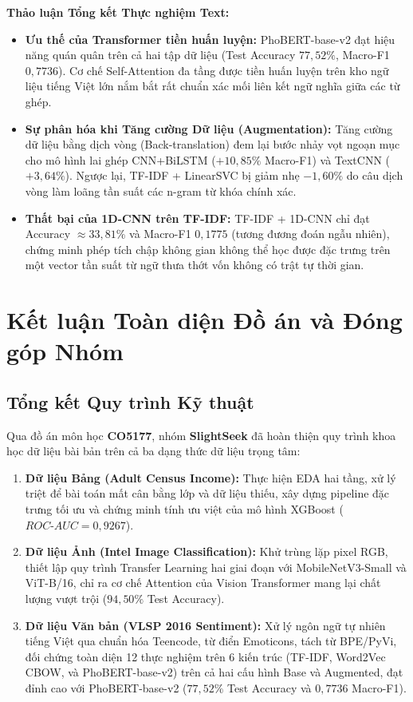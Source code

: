 \documentclass[a4paper,11pt]{article}
\begin{document}
\noindent \textbf{Thảo luận Tổng kết Thực nghiệm Text:}
\begin{itemize}
    \item \textbf{Ưu thế của Transformer tiền huấn luyện:} PhoBERT-base-v2 đạt hiệu năng quán quân trên cả hai tập dữ liệu (Test Accuracy $77{,}52\%$, Macro-F1 $0{,}7736$). Cơ chế Self-Attention đa tầng được tiền huấn luyện trên kho ngữ liệu tiếng Việt lớn nắm bắt rất chuẩn xác mối liên kết ngữ nghĩa giữa các từ ghép.
    \item \textbf{Sự phân hóa khi Tăng cường Dữ liệu (Augmentation):} Tăng cường dữ liệu bằng dịch vòng (Back-translation) đem lại bước nhảy vọt ngoạn mục cho mô hình lai ghép CNN+BiLSTM ($+10{,}85\%$ Macro-F1) và TextCNN ($+3{,}64\%$). Ngược lại, TF-IDF + LinearSVC bị giảm nhẹ $-1{,}60\%$ do câu dịch vòng làm loãng tần suất các n-gram từ khóa chính xác.
    \item \textbf{Thất bại của 1D-CNN trên TF-IDF:} TF-IDF + 1D-CNN chỉ đạt Accuracy $\approx 33{,}81\%$ và Macro-F1 $0{,}1775$ (tương đương đoán ngẫu nhiên), chứng minh phép tích chập không gian không thể học được đặc trưng trên một vector tần suất từ ngữ thưa thớt vốn không có trật tự thời gian.
\end{itemize}

\newpage
\section{Kết luận Toàn diện Đồ án và Đóng góp Nhóm}

\subsection{Tổng kết Quy trình Kỹ thuật}
Qua đồ án môn học \textbf{CO5177}, nhóm \textbf{SlightSeek} đã hoàn thiện quy trình khoa học dữ liệu bài bản trên cả ba dạng thức dữ liệu trọng tâm:
\begin{enumerate}
    \item \textbf{Dữ liệu Bảng (Adult Census Income):} Thực hiện EDA hai tầng, xử lý triệt để bài toán mất cân bằng lớp và dữ liệu thiếu, xây dựng pipeline đặc trưng tối ưu và chứng minh tính ưu việt của mô hình XGBoost ($ROC\text{-}AUC = 0{,}9267$).
    \item \textbf{Dữ liệu Ảnh (Intel Image Classification):} Khử trùng lặp pixel RGB, thiết lập quy trình Transfer Learning hai giai đoạn với MobileNetV3-Small và ViT-B/16, chỉ ra cơ chế Attention của Vision Transformer mang lại chất lượng vượt trội ($94{,}50\%$ Test Accuracy).
    \item \textbf{Dữ liệu Văn bản (VLSP 2016 Sentiment):} Xử lý ngôn ngữ tự nhiên tiếng Việt qua chuẩn hóa Teencode, từ điển Emoticons, tách từ BPE/PyVi, đối chứng toàn diện 12 thực nghiệm trên 6 kiến trúc (TF-IDF, Word2Vec CBOW, và PhoBERT-base-v2) trên cả hai cấu hình Base và Augmented, đạt đỉnh cao với PhoBERT-base-v2 ($77{,}52\%$ Test Accuracy và $0{,}7736$ Macro-F1).
\end{enumerate}
\end{document}
